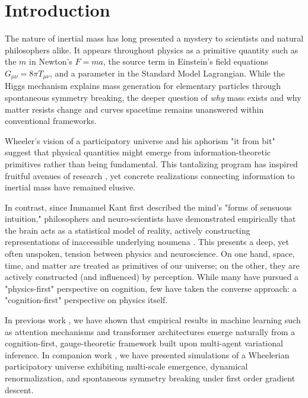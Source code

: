 \documentclass[11pt]{article}
\begin{document}
\section{Introduction}
\label{sec:intro}
The nature of inertial mass has long presented a mystery to scientists and natural philosophers alike. It appears throughout physics as a primitive quantity such as the $m$ in Newton's $F = ma$, the source term in Einstein's field equations $G_{\mu\nu} = 8\pi T_{\mu\nu}$, and a parameter in the Standard Model Lagrangian. While the Higgs mechanism explains mass generation for elementary particles through spontaneous symmetry breaking, the deeper question of \emph{why} mass exists and why matter resists change and curves spacetime remains unanswered within conventional frameworks.

Wheeler's vision of a participatory universe \cite{Wheeler1990} and his aphorism "it from bit" suggest that physical quantities might emerge from information-theoretic primitives rather than being fundamental. This tantalizing program has inspired fruitful avenues of research \cite{Verlinde2011,Jacobson1995}, yet concrete realizations connecting information to inertial mass have remained elusive.

In contrast, since Immanuel Kant first described the mind's "forms of sensuous intuition," philosophers and neuro-scientists have demonstrated empirically that the brain acts as a statistical model of reality, actively constructing representations of inaccessible underlying noumena \cite{Kant1781, Helmholtz1867,Friston2010}. This presents a deep, yet often unspoken, tension between physics and neuroscience. On one hand, space, time, and matter are treated as primitives of our universe; on the other, they are actively constructed (and influenced) by perception. While many have pursued a "physics-first" perspective on cognition, few have taken the converse approach: a "cognition-first" perspective on physics itself.

In previous work \cite{Dennis2025, Dennis2025b}, we have shown that empirical results in machine learning such as attention mechanisms and transformer architectures emerge naturally from a cognition-first, gauge-theoretic framework built upon multi-agent variational inference. In companion work \cite{Dennis2025a}, we have presented simulations of a Wheelerian participatory universe exhibiting multi-scale emergence, dynamical renormalization, and spontaneous symmetry breaking under first order gradient descent.
\end{document}
